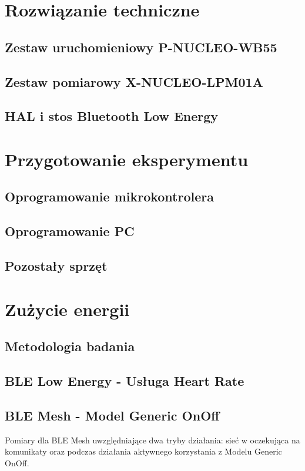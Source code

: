 \section{Rozwiązanie techniczne}
\subsection{Zestaw uruchomieniowy P-NUCLEO-WB55}
\subsection{Zestaw pomiarowy X-NUCLEO-LPM01A}
\subsection{HAL i stos Bluetooth Low Energy}

\section{Przygotowanie eksperymentu}
\subsection{Oprogramowanie mikrokontrolera}
\subsection{Oprogramowanie PC}
\subsection{Pozostały sprzęt}

\section{Zużycie energii}
\subsection{Metodologia badania}
\subsection{BLE Low Energy - Usługa Heart Rate}
\subsection{BLE Mesh - Model Generic OnOff}

Pomiary dla BLE Mesh uwzględniające dwa tryby działania: sieć w oczekująca na komunikaty oraz podczas działania aktywnego korzystania z Modelu Generic OnOff.

